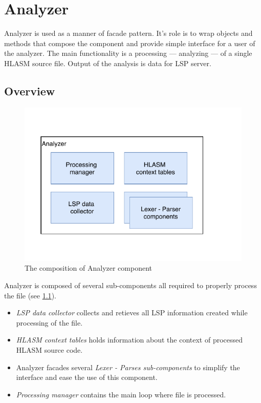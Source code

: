 \chapter {Analyzer}

Analyzer is used as a manner of facade pattern. It's role is to wrap objects and methods that compose the component and provide simple interface for a user of the analyzer. The main functionality is a processing --- analyzing --- of a single HLASM source file. Output of the analysis is data for LSP server.

\section{Overview}

\begin{figure}
	\centering
	\includegraphics[width=\textwidth / 2]{img/analyzer_arch}
	\caption{The composition of Analyzer component}
	\label{fig06:analyzer}
\end{figure}

Analyzer is composed of several sub-components all required to properly process the file (see \cref{fig06:analyzer}). 
\begin{itemize}
	\item \emph{LSP data collector} collects and retieves all LSP information created while processing of the file.
	\item \emph{HLASM context tables} holds information about the context of processed HLASM source code.
	\item Analyzer facades several \emph{Lexer - Parses sub-components} to simplify the interface and ease the use of this component.
	\item \emph{Processing manager} contains the main loop where file is processed.
\end{itemize}


